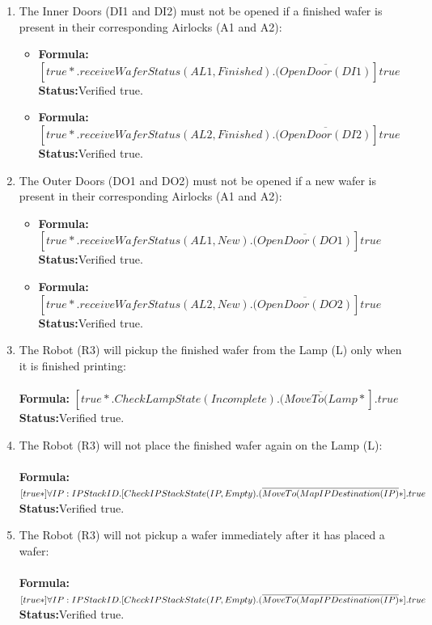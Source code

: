 \documentclass[a4paper,12pt]{article}
\begin{document}
\begin{enumerate}
		
		\item The Inner Doors (DI1 and DI2) must not be opened if a finished wafer is present in their corresponding Airlocks (A1 and A2):
		\begin{itemize}
			\item \textbf{Formula:} $[true*.receiveWaferStatus(AL1,Finished).(\overline{OpenDoor(DI1)}]true$ 
			\\\textbf{Status:}Verified true.
			\item \textbf{Formula:} $[true*.receiveWaferStatus(AL2,Finished).(\overline{OpenDoor(DI2)}]true$  
			\\\textbf{Status:}Verified true.
		\end{itemize}
		
		
		\item The Outer Doors (DO1 and DO2) must not be opened if a new wafer is present in their corresponding Airlocks (A1 and A2):
		\begin{itemize}
			\item \textbf{Formula:} $[true*.receiveWaferStatus(AL1,New).(\overline{OpenDoor(DO1)}]true$ 
			\\\textbf{Status:}Verified true.
			\item \textbf{Formula:} $[true*.receiveWaferStatus(AL2,New).(\overline{OpenDoor(DO2)}]true$  
			\\\textbf{Status:}Verified true.
		\end{itemize}
		
		
		\item The Robot (R3) will pickup the finished wafer from the Lamp (L) only when it is finished printing:
		\\
		\\\textbf{Formula:} $[true*.CheckLampState(Incomplete).(\overline{MoveTo(Lamp}*].true$ \\\textbf{Status:}Verified true.
		
		\item The Robot (R3) will not place the finished wafer again on the Lamp (L):
		\\
		\\\textbf{Formula:} $[true*] \forall IP: IPStackID.[CheckIPStackState(IP, Empty).
		\\(\overline{MoveTo(MapIPDestination(IP)}*].true$ \\\textbf{Status:}Verified true.
		
		\item The Robot (R3) will not pickup a wafer immediately after it has placed a wafer:
		\\
		\\\textbf{Formula:} $[true*] \forall IP: IPStackID.[CheckIPStackState(IP, Empty).
		\\(\overline{MoveTo(MapIPDestination(IP)}*].true$ \\\textbf{Status:}Verified true.
		

\end{enumerate}
\end{document}
